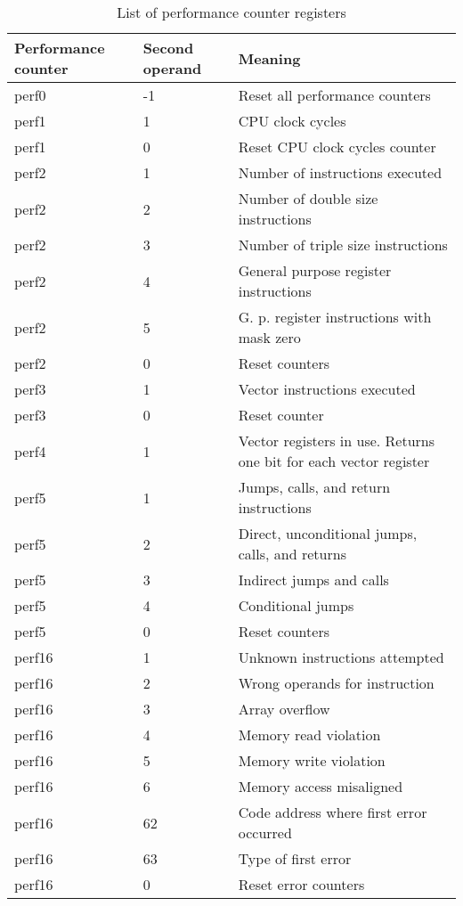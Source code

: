 \documentclass[forwardcom.tex]{subfiles}
\begin{document}
\begin{longtable} {|p{15mm}|p{15mm}|p{85mm}|}
\caption{List of performance counter registers} 
\label{table:performanceCounters} \\
\endfirsthead
\endhead
\hline
\bfseries Performance counter & \bfseries Second operand & \bfseries Meaning  \\
\hline
perf0  & -1 & Reset all performance counters \\
\hline
perf1  & 1 & CPU clock cycles \\
perf1  & 0 & Reset CPU clock cycles counter \\
\hline
perf2  & 1 & Number of instructions executed \\
perf2  & 2 & Number of double size instructions \\
perf2  & 3 & Number of triple size instructions \\
perf2  & 4 & General purpose register instructions \\
perf2  & 5 & G. p. register instructions with mask zero \\
perf2  & 0 & Reset counters \\
\hline
perf3  & 1 & Vector instructions executed \\
perf3  & 0 & Reset counter \\
\hline
perf4  & 1 & Vector registers in use. Returns one bit for each vector register \\
\hline
perf5  & 1 & Jumps, calls, and return instructions \\
perf5  & 2 & Direct, unconditional jumps, calls, and returns \\
perf5  & 3 & Indirect jumps and calls \\
perf5  & 4 & Conditional jumps \\
perf5  & 0 & Reset counters \\
\hline
perf16 & 1  & Unknown instructions attempted \\
perf16 & 2  & Wrong operands for instruction \\
perf16 & 3  & Array overflow  \\
perf16 & 4  & Memory read violation \\
perf16 & 5  & Memory write violation \\
perf16 & 6  & Memory access misaligned \\
perf16 & 62 & Code address where first error occurred  \\
perf16 & 63 & Type of first error \\
perf16 & 0  & Reset error counters \\
\hline
\end{longtable}
\vv
\end{document}

